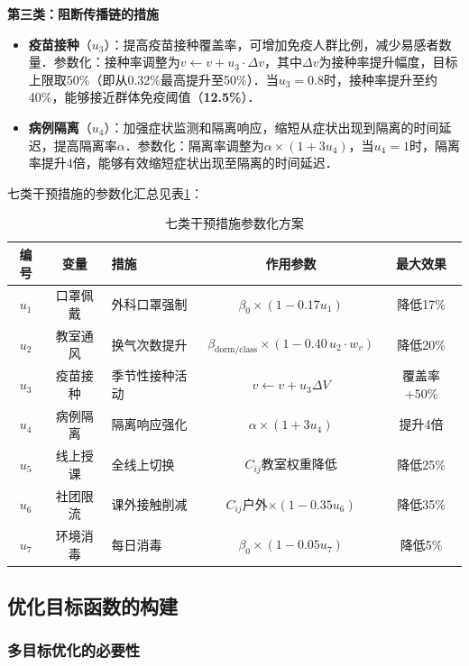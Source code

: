 \textbf{第三类：阻断传播链的措施}

\begin{itemize}
  \item \textbf{疫苗接种}（$u_3$）：提高疫苗接种覆盖率，可增加免疫人群比例，减少易感者数量．参数化：接种率调整为$v \leftarrow v + u_3 \cdot \Delta v$，其中$\Delta v$为接种率提升幅度，目标上限取50\%（即从0.32\%最高提升至50\%）．当$u_3 = 0.8$时，接种率提升至约40\%，能够接近群体免疫阈值（\textbf{12.5\%}）．
  
  \item \textbf{病例隔离}（$u_4$）：加强症状监测和隔离响应，缩短从症状出现到隔离的时间延迟，提高隔离率$\alpha$．参数化：隔离率调整为$\alpha \times (1 + 3 u_4)$，当$u_4 = 1$时，隔离率提升4倍，能够有效缩短症状出现至隔离的时间延迟．
\end{itemize}

七类干预措施的参数化汇总见表\ref{tab:interventions}：

\begin{table}[H]
  \centering
  \caption{七类干预措施参数化方案}
  \label{tab:interventions}
  \small
  \begin{tabular}{cclcc}
    \toprule
    编号 & 变量 & 措施 & 作用参数 & 最大效果 \\
    \midrule
    $u_1$ & 口罩佩戴 & 外科口罩强制 & $\beta_0 \times (1-0.17u_1)$ & 降低17\% \\
    $u_2$ & 教室通风 & 换气次数提升 & $\beta_{\text{dorm/class}} \times \left(1 - 0.40\, u_2 \cdot w_v\right)$ & 降低20\% \\
    $u_3$ & 疫苗接种 & 季节性接种活动 & $v \leftarrow v+u_3\Delta V$ & 覆盖率+50\% \\
    $u_4$ & 病例隔离 & 隔离响应强化 & $\alpha \times (1+3u_4)$ & 提升4倍 \\
    $u_5$ & 线上授课 & 全线上切换 & $C_{ij}$教室权重降低  & 降低25\% \\
    $u_6$ & 社团限流 & 课外接触削减 & $C_{ij}$户外$\times(1-0.35u_6)$ & 降低35\% \\
    $u_7$ & 环境消毒 & 每日消毒 & $\beta_0 \times (1-0.05u_7)$ & 降低5\% \\
    \bottomrule
  \end{tabular}
\end{table}

\subsection{优化目标函数的构建}

\subsubsection{多目标优化的必要性}

